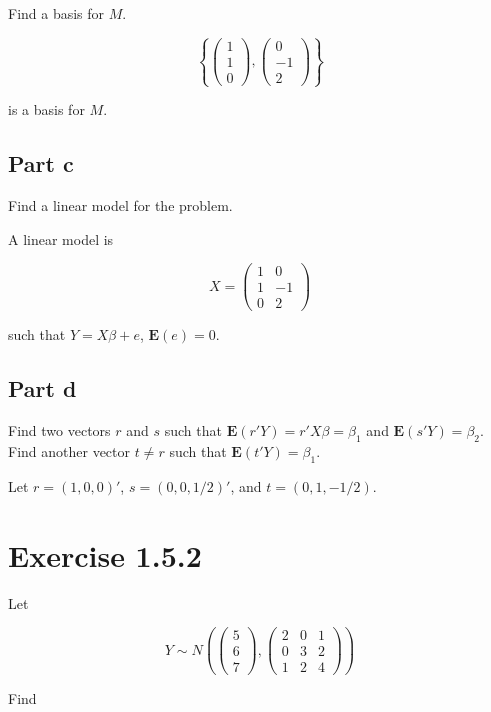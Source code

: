 \documentclass{article}
\newcommand{\E}{\boldsymbol{E}}
\begin{document}
Find a basis for $M$.

\[
\left\{
\begin{pmatrix}
1\\1\\0
\end{pmatrix},
\begin{pmatrix}
0\\-1\\2
\end{pmatrix}
\right\}
\]

is a basis for $M$.

\subsection*{Part c}

Find a linear model for the problem.

A linear model is

\[
X = \begin{pmatrix}
1 & 0 \\
1 & -1 \\
0 & 2
\end{pmatrix}
\]

such that $Y = X\beta + e$, $\E(e)=0$.

\subsection*{Part d}

Find two vectors $r$ and $s$ such that $\E(r'Y) = r'X\beta = \beta_1$ and $\E(s'Y) =\beta_2$. Find another vector $t \neq r$ such that $\E(t'Y)=\beta_1$.

Let $r = (1, 0, 0)'$, $s = (0, 0, 1/2)'$, and $t=(0, 1, -1/2)$.

\section*{Exercise 1.5.2}

Let

\[
Y \sim N\left(
\begin{pmatrix}
5 \\ 6 \\ 7
\end{pmatrix},
\begin{pmatrix}
2 & 0 & 1 \\
0 & 3 & 2 \\
1 & 2 & 4
\end{pmatrix}
\right)
\]

Find
\end{document}
